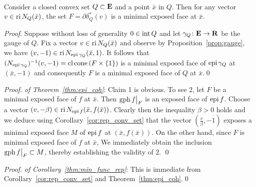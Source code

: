 \documentclass[smallextended,numbook]{svjour3}
\begin{document}
\begin{appendices}
\begin{cor}\label{cor:rep_conv_set} \hfill \\
Consider a closed convex set $Q\subset{{\bf E}}$ and a point $\bar{x}$ in $Q$. Then for any vector $v\in {\mbox{\rm ri}\,} N_Q(\bar{x})$, the set $F=\partial \delta^{*}_Q(v)$
is a minimal exposed face at $\bar{x}$.
\end{cor}
\begin{proof}
Suppose without loss of generality $0\in{\mbox{\rm int}\,} Q$ and let $\gamma_Q\colon {{\bf E}}\to{{\bf R}}$ be the gauge of $Q$. Fix a vector $v\in {\mbox{\rm ri}\,} N_Q(\bar{x})$ and observe by Proposition~\ref{prop:gauge}, we have $(v,-1)\in{\mbox{\rm ri}\,} N_{{\mbox{\rm {\scriptsize epi}}\,} \gamma_Q}(\bar{x},1)$. 
It follows that $(N_{{\mbox{\rm {\scriptsize epi}}\,} \gamma_Q})^{-1}(v,-1)={\mbox{\rm cl}\,}{\mbox{\rm cone}\,} (F\times \{1\})$ is a minimal exposed face of ${\mbox{\rm epi}\,} \gamma_Q$ at $(\bar{x},-1)$ and consequently $F$ is a minimal exposed face of $Q$ at $\bar{x}$.\qed
\end{proof}

\begin{proof}{\em of Theorem~\ref{thm:epi_coh}}: Claim 1 is obvious. To see 2, let $F$ be a minimal exposed face of $f$ at $\bar{x}$. Then ${\mbox{\rm gph}\,} f\big|_F$ is an exposed face of ${\mbox{\rm epi}\,} f$. Choose a vector $(v,-\beta)\in {\mbox{\rm ri}\,} N_{{\mbox{\rm {\scriptsize epi}}\,} f}(\bar{x},f(\bar{x}))$. Clearly then the inequality $\beta >0$ holds and we deduce using Corollary~\ref{cor:rep_conv_set} that the vector $(\frac{v}{\beta},-1)$  
exposes a minimal exposed face $M$ of ${\mbox{\rm epi}\,} f$ at $(\bar{x},f(\bar{x}))$. On the other hand, since $F$ is minimal exposed face of $f$ at $\bar{x}$, We immediately obtain the inclusion ${\mbox{\rm gph}\,} f\big|_F\subset M$, thereby establishing the validity of $2$. \qed
\end{proof}

\begin{proof}{\em of Corollary~\ref{thm:min_func_rep}}:
This is immediate from Corollary~\ref{cor:rep_conv_set} and Theorem~\ref{thm:epi_coh}.\qed
\end{proof}

\end{appendices}
\end{document}
